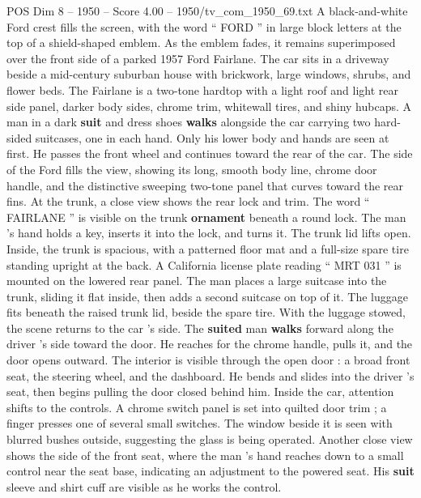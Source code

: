 \begin{textsample}{POS Dim 8 – 1950 – Score 4.00 – 1950/tv\_com\_1950\_69.txt}  \label{ex:f8_pos_075}
A black-and-white Ford crest fills the screen, with the word “ FORD ” in large block letters at the top of a shield-shaped emblem.
As the emblem fades, it remains superimposed over the front side of a parked 1957 Ford Fairlane.
The car sits in a driveway beside a mid-century suburban house with brickwork, large windows, shrubs, and flower beds.
The Fairlane is a two-tone hardtop with a light roof and light rear side panel, darker body sides, chrome trim, whitewall tires, and shiny hubcaps.
A man in a dark \textbf{suit} and dress shoes \textbf{walks} alongside the car carrying two hard-sided suitcases, one in each hand.
Only his lower body and hands are seen at first.
He passes the front wheel and continues toward the rear of the car.
The side of the Ford fills the view, showing its long, smooth body line, chrome door handle, and the distinctive sweeping two-tone panel that curves toward the rear fins.
At the trunk, a close view shows the rear lock and trim.
The word “ FAIRLANE ” is visible on the trunk \textbf{ornament} beneath a round lock.
The man ’s hand holds a key, inserts it into the lock, and turns it.
The trunk lid lifts open.
Inside, the trunk is spacious, with a patterned floor mat and a full-size spare tire standing upright at the back.
A California license plate reading “ MRT 031 ” is mounted on the lowered rear panel.
The man places a large suitcase into the trunk, sliding it flat inside, then adds a second suitcase on top of it.
The luggage fits beneath the raised trunk lid, beside the spare tire.
With the luggage stowed, the scene returns to the car ’s side.
The \textbf{suited} man \textbf{walks} forward along the driver ’s side toward the door.
He reaches for the chrome handle, pulls it, and the door opens outward.
The interior is visible through the open door : a broad front seat, the steering wheel, and the dashboard.
He bends and slides into the driver ’s seat, then begins pulling the door closed behind him.
Inside the car, attention shifts to the controls.
A chrome switch panel is set into quilted door trim ; a finger presses one of several small switches.
The window beside it is seen with blurred bushes outside, suggesting the glass is being operated.
Another close view shows the side of the front seat, where the man ’s hand reaches down to a small control near the seat base, indicating an adjustment to the powered seat.
His \textbf{suit} sleeve and shirt cuff are visible as he works the control.

\end{textsample}
